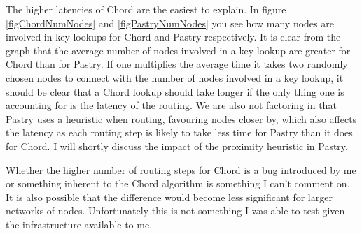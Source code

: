 \mbox{}

The higher latencies of Chord are the easiest to explain. In figure \ref{figChordNumNodes} and \ref{figPastryNumNodes} you see how many nodes are involved in key lookups for Chord and Pastry respectively. It is clear from the graph that the average number of nodes involved in a key lookup are greater for Chord than for Pastry. If one multiplies the average time it takes two randomly chosen nodes to connect with the number of nodes involved in a key lookup, it should be clear that a Chord lookup should take longer if the only thing one is accounting for is the latency of the routing. We are also not factoring in that Pastry uses a heuristic when routing, favouring nodes closer by, which also affects the latency as each routing step is likely to take less time for Pastry than it does for Chord. I will shortly discuss the impact of the proximity heuristic in Pastry.

Whether the higher number of routing steps for Chord is a bug introduced by me or something inherent to the Chord algorithm is something I can't comment on. It is also possible that the difference would become less significant for larger networks of nodes. Unfortunately this is not something I was able to test given the infrastructure available to me.

